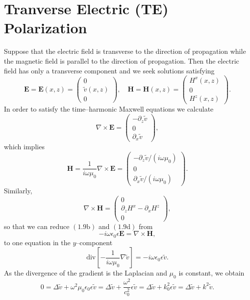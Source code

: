 \section{Tranverse Electric (TE) Polarization}
\label{intro:te_polarization}

Suppose that the electric field is transverse to the direction of propagation while the magnetic field is parallel to the direction of propagation. Then the electric field has only a transverse component and we seek solutions satisfying
\begin{equation}
\textbf{E}=\textbf{E}(x,z)=\begin{pmatrix}
0\\ \tilde{v}(x,z) \\ 0
\end{pmatrix},\quad 
\textbf{H}=\textbf{H}(x,z)=\begin{pmatrix}
H^x(x,z)\\ 0 \\ H^z(x,z)
\end{pmatrix}.
\end{equation}
In order to satisfy the time--harmonic Maxwell equations we calculate
$$\nabla \times \textbf{E}= \begin{pmatrix}
-\partial_z \tilde{v}\\ 0 \\ \partial_x \tilde{v}
\end{pmatrix},$$
which implies
$$\textbf{H} = \frac{1}{i\omega\mu_0}\nabla \times \textbf{E} =\begin{pmatrix}
-\partial_z \tilde{v}/(i\omega\mu_0)\\ 0 \\ \partial_x \tilde{v}/(i\omega\mu_0)
\end{pmatrix}.$$
Similarly,
$$\nabla \times \textbf{H}=\begin{pmatrix}
0\\ \partial_z H^x - \partial_x H^z \\ 0
\end{pmatrix},$$
so that we can reduce $(1.9\text{b})$ and $(1.9\text{d})$ from
$$-i\omega\epsilon_0\epsilon \textbf{E} = \nabla \times \textbf{H},$$
to one equation in the $y$--component
$$\text{div}\left[-\frac{1}{i\omega \mu_0}\nabla \tilde{v}\right]= - i\omega \epsilon_0\epsilon \tilde{v}.$$
As the divergence of the gradient is the Laplacian and $\mu_0$ is constant, we obtain
\begin{equation}
 0=\Delta \tilde{v} + \omega^2\mu_0\epsilon_0\epsilon \tilde{v} = \Delta \tilde{v}+\frac{\omega^2}{c_0^2}\epsilon \tilde{v}=\Delta \tilde{v}+k_0^2\epsilon \tilde{v} = \Delta \tilde{v}+k^2\tilde{v}. 
\end{equation}
